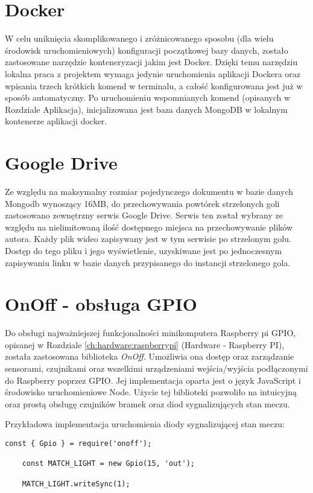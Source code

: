 \label{section:docker}
\section{Docker}
W celu uniknięcia skomplikowanego i zróżnicowanego sposobu (dla wielu środowisk uruchomieniowych) konfiguracji początkowej bazy danych, zostało zastosowane narzędzie konteneryzacji jakim jest Docker. Dzięki temu narzędziu lokalna praca z projektem wymaga jedynie uruchomienia aplikacji Dockera oraz wpisania trzech krótkich komend w terminalu, a całość konfigurowana jest już w sposób automatyczny. Po uruchomieniu wspomnianych komend (opisanych w Rozdziale Aplikacja), inicjalizowana jest baza danych MongoDB w lokalnym kontenerze aplikacji docker.

\label{section:googleDrive}
\section{Google Drive}
Ze względu na maksymalny rozmiar pojedynczego dokumentu w bazie danych Mongodb wynoszący 16MB, do przechowywania powtórek strzelonych goli zastosowano zewnętrzny serwis Google Drive. Serwis ten został wybrany ze względu na nielimitowaną ilość dostępnego miejsca na przechowywanie plików autora. Każdy plik wideo zapisywany jest w tym serwisie po strzelonym golu. Dostęp do tego pliku i jego wyświetlenie, uzyskiwane jest po jednoczesnym zapisywaniu linku w bazie danych przypisanego do instancji strzelonego gola.

\section{OnOff - obsługa GPIO}
Do obsługi najważniejszej funkcjonalności minikomputera Raspberry pi GPIO, opisanej w Rozdziale \ref{ch:hardware:raspberrypi} (Hardware - Raspberry PI), została zastosowana biblioteka \textit{OnOff}. Umożliwia ona dostęp oraz zarządzanie sensorami, czujnikami oraz wszelkimi urządzeniami wejścia/wyjścia podłączonymi do Raspberry poprzez GPIO. Jej implementacja oparta jest o język JavaScript i środowisko uruchomieniowe Node. Użycie tej biblioteki pozwoliło na intuicyjną oraz prostą obsługę czujników bramek oraz diod sygnalizujących stan meczu.

Przykładowa implementacja uruchomienia diody sygnalizującej stan meczu:

\begin{lstlisting}[breaklines=true]
    const { Gpio } = require('onoff');

    const MATCH_LIGHT = new Gpio(15, 'out');

    MATCH_LIGHT.writeSync(1);
\end{lstlisting}


